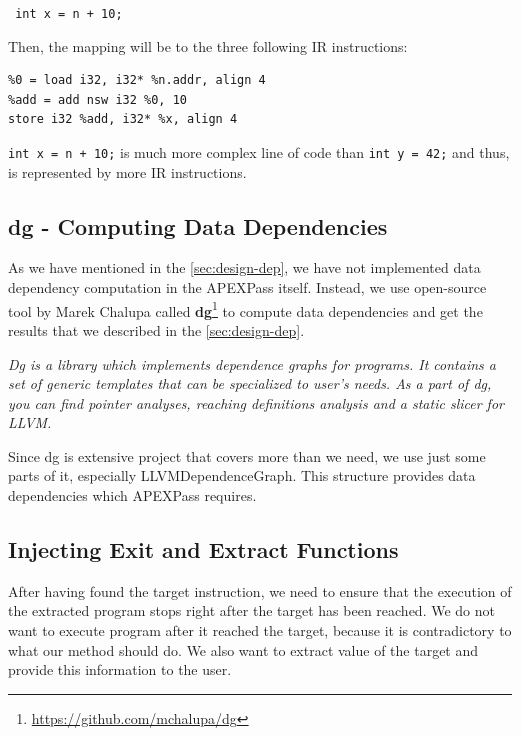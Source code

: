 \documentclass[12pt, twoside]{fithesis2}
\renewcommand{\_}{\leavevmode \kern0.07em\vbox{\hrule width0.4em}}
\begin{document}
\texttt{
int x = n + 10;
}

Then, the mapping will be to the three following IR instructions:

\begin{verbatim}
%0 = load i32, i32* %n.addr, align 4
%add = add nsw i32 %0, 10
store i32 %add, i32* %x, align 4
\end{verbatim}

\texttt{int x = n + 10;} is much more complex line of code than
\texttt{int y = 42;} and thus, is represented by more IR instructions.


\subsection{dg - Computing Data Dependencies}

As we have mentioned in the \autoref{sec:design-dep}, we have not implemented
data dependency computation in the APEXPass itself.
Instead, we use open-source tool by Marek Chalupa called \textbf{dg}\footnote{
\url{https://github.com/mchalupa/dg}
}
to compute data dependencies and get the results that we described in the
\autoref{sec:design-dep}.

\emph{Dg is a library which implements dependence graphs for programs. It
contains a set of generic templates that can be specialized to user's needs.
As a part of dg, you can find pointer analyses, reaching definitions analysis
and a static slicer for LLVM.}\cite{dg-github}

Since dg is extensive project that covers more than we need, we use just
some parts of it, especially LLVMDependenceGraph. This structure provides
data dependencies which APEXPass requires.

\subsection{Injecting Exit and Extract Functions}
\label{sub:impl_inject}

After having found the target instruction, we need to ensure that the execution
of the extracted program stops right after the target has been reached.
We do not want to execute program after it reached the target, because it is
contradictory to what our method should do.
We also want to extract value of the target and provide this information to the
user.
\end{document}
